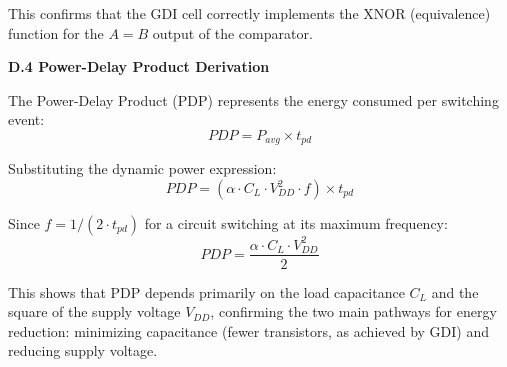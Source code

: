 \documentclass[12pt,a4paper,oneside]{report}
\begin{document}
\noindent This confirms that the GDI cell correctly implements the XNOR (equivalence) function for the $A=B$ output of the comparator.

\vspace{0.5cm}
\noindent\textbf{D.4 Power-Delay Product Derivation}

\noindent The Power-Delay Product (PDP) represents the energy consumed per switching event:
\begin{equation}
PDP = P_{avg} \times t_{pd}
\end{equation}

\noindent Substituting the dynamic power expression:
\begin{equation}
PDP = (\alpha \cdot C_L \cdot V_{DD}^2 \cdot f) \times t_{pd}
\end{equation}

\noindent Since $f = 1/(2 \cdot t_{pd})$ for a circuit switching at its maximum frequency:
\begin{equation}
PDP = \frac{\alpha \cdot C_L \cdot V_{DD}^2}{2}
\end{equation}

\noindent This shows that PDP depends primarily on the load capacitance $C_L$ and the square of the supply voltage $V_{DD}$, confirming the two main pathways for energy reduction: minimizing capacitance (fewer transistors, as achieved by GDI) and reducing supply voltage.
\end{document}
